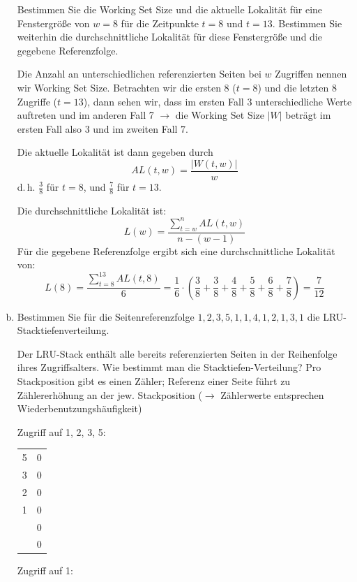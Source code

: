 \begin{enumerate}[a)]
Bestimmen Sie die Working Set Size und die aktuelle Lokalität für eine Fenstergröße von \(w = 8\) für die Zeitpunkte \(t=8\) und \(t=13\).
Bestimmen Sie weiterhin die durchschnittliche Lokalität für diese Fenstergröße und die gegebene Referenzfolge.

\begin{solution}
Die Anzahl an unterschiedlichen referenzierten Seiten bei $w$ Zugriffen nennen wir Working Set Size. Betrachten wir  die ersten 8 (\(t=8\)) und die letzten 8 Zugriffe (\(t=13\)), dann sehen wir, dass im ersten Fall 3 unterschiedliche Werte auftreten und im anderen Fall 7 $\rightarrow$ die Working Set Size $|W|$ beträgt im ersten Fall also $3$ und im zweiten Fall $7$.

Die aktuelle Lokalität ist dann gegeben durch	\[AL(t, w) = \frac{|W(t, w)|}{w}\] d.\,h. $\frac{3}{8}$
für \(t=8\), und $\frac{7}{8}$ für \(t=13\).

Die durchschnittliche Lokalität ist: \[L(w) = \frac{\sum_{t = w}^n AL(t, w)}{n-(w-1)}\]
Für die gegebene Referenzfolge ergibt sich eine durchschnittliche Lokalität von:
\begin{equation*}
	 L(8) = \frac{\sum_{t = 8}^{13} AL(t, 8)}{6} = \frac{1}{6} \cdot (\frac{3}{8}+\frac{3}{8}+\frac{4}{8}+\frac{5}{8}+\frac{6}{8}+\frac{7}{8}) = \frac{7}{12}
\end{equation*}

\end{solution}

    \item Bestimmen Sie für die Seitenreferenzfolge $1, 2, 3, 5, 1, 1, 4, 1, 2, 1, 3, 1$ die LRU-Stack\-tie\-fen\-ver\-tei\-lung.

\begin{solution}
Der LRU-Stack enthält alle bereits referenzierten Seiten in der Reihenfolge ihres Zugriffsalters. Wie bestimmt man die Stacktiefen-Verteilung? Pro Stackposition gibt es einen Zähler; Referenz einer Seite führt zu Zählererhöhung an der jew. Stackposition ($\rightarrow$ Zählerwerte entsprechen Wiederbenutzungshäufigkeit)


    \begin{minipage}{0.28\textwidth}
        \center
        Zugriff auf 1, 2, 3, 5:

        \begin{tabular}{ | c | l}
            \cline{1-1}
            5   &   0   \\  \cline{1-1}
            3   &   0   \\  \cline{1-1}
            2   &   0   \\  \cline{1-1}
            1   &   0   \\  \cline{1-1}
                &   0   \\  \cline{1-1}
                &   0   \\  \cline{1-1}
        \end{tabular}
    \end{minipage}
    \begin{minipage}{0.22\textwidth}
        \center
        Zugriff auf 1:


\end{minipage}
\end{solution}
\end{enumerate}
